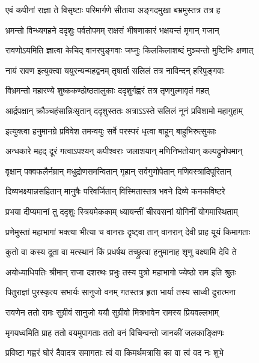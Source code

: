 \twolineshloka
{एवं कपीनां राज्ञा ते विसृष्टाः परिमार्गणे}
{सीताया अङ्गदमुखा बभ्रमुस्तत्र तत्र ह} %

\twolineshloka
{भ्रमन्तो विन्ध्यगहने ददृशुः पर्वतोपमम्}
{राक्षसं भीषणाकारं भक्षयन्तं मृगान् गजान्} %

\twolineshloka
{रावणोऽयमिति ज्ञात्वा केचिद् वानरपुङ्गवाः}
{जघ्नुः किलकिलाशब्दं मुञ्चन्तो मुष्टिभिः क्षणात्} %

\twolineshloka
{नायं रावण इत्युक्त्वा ययुरन्यन्महद्वनम्}
{तृषार्ता सलिलं तत्र नाविन्दन् हरिपुङ्गवाः} %

\twolineshloka
{विभ्रमन्तो महारण्ये शुष्ककण्ठोष्ठतालुकाः}
{ददृशुर्गह्वरं तत्र तृणगुल्मावृतं महत्} %

\twolineshloka
{आर्द्रपक्षान् क्रौञ्चहंसान्निःसृतान् ददृशुस्ततः}
{अत्राऽऽस्ते सलिलं नूनं प्रविशामो महागुहाम्} %

\twolineshloka
{इत्युक्त्वा हनुमानग्रे प्रविवेश तमन्वयुः}
{सर्वे परस्परं धृत्वा बाहून् बाहुभिरुत्सुकाः} %

\twolineshloka
{अन्धकारे महद् दूरं गत्वाऽपश्यन् कपीश्वराः}
{जलाशयान् मणिनिभतोयान् कल्पद्रुमोपमान्} %

\twolineshloka
{वृक्षान् पक्वफलैर्नम्रान् मधुद्रोणसमन्वितान्}
{गृहान् सर्वगुणोपेतान् मणिवस्त्रादिपूरितान्} %

\twolineshloka
{दिव्यभक्ष्यान्नसहितान् मानुषैः परिवर्जितान्}
{विस्मितास्तत्र भवने दिव्ये कनकविष्टरे} %

\twolineshloka
{प्रभया दीप्यमानां तु ददृशुः स्त्रियमेककाम्}
{ध्यायन्तीं चीरवसनां योगिनीं योगमास्थिताम्} %

\twolineshloka
{प्रणेमुस्तां महाभागां भक्त्या भीत्या च वानराः}
{दृष्ट्वा तान् वानरान् देवी प्राह यूयं किमागताः} %

\twolineshloka
{कुतो वा कस्य दूता वा मत्स्थानं किं प्रधर्षथ}
{तच्छ्रुत्वा हनुमानाह शृणु वक्ष्यामि देवि ते} %

\twolineshloka
{अयोध्याधिपतिः श्रीमान् राजा दशरथः प्रभुः}
{तस्य पुत्रो महाभागो ज्येष्ठो राम इति श्रुतः} %

\twolineshloka
{पितुराज्ञां पुरस्कृत्य सभार्यः सानुजो वनम्}
{गतस्तत्र हृता भार्या तस्य साध्वी दुरात्मना} %

\twolineshloka
{रावणेन ततो रामः सुग्रीवं सानुजो ययौ}
{सुग्रीवो मित्रभावेन रामस्य प्रियवल्लभाम्} %

\twolineshloka
{मृगयध्वमिति प्राह ततो वयमुपागताः}
{ततो वनं विचिन्वन्तो जानकीं जलकाङ्क्षिणः} %

\twolineshloka
{प्रविष्टा गह्वरं घोरं दैवादत्र समागताः}
{त्वं वा किमर्थमत्रासि का वा त्वं वद नः शुभे} %


